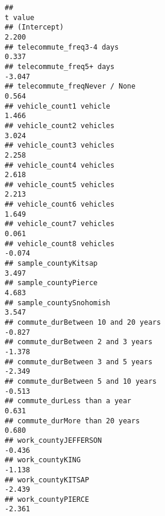 \documentclass[
]{article}
\begin{document}
\begin{verbatim}
##                                                                                             t value
## (Intercept)                                                                                   2.200
## telecommute_freq3-4 days                                                                      0.337
## telecommute_freq5+ days                                                                      -3.047
## telecommute_freqNever / None                                                                  0.564
## vehicle_count1 vehicle                                                                        1.466
## vehicle_count2 vehicles                                                                       3.024
## vehicle_count3 vehicles                                                                       2.258
## vehicle_count4 vehicles                                                                       2.618
## vehicle_count5 vehicles                                                                       2.213
## vehicle_count6 vehicles                                                                       1.649
## vehicle_count7 vehicles                                                                       0.061
## vehicle_count8 vehicles                                                                      -0.074
## sample_countyKitsap                                                                           3.497
## sample_countyPierce                                                                           4.683
## sample_countySnohomish                                                                        3.547
## commute_durBetween 10 and 20 years                                                           -0.827
## commute_durBetween 2 and 3 years                                                             -1.378
## commute_durBetween 3 and 5 years                                                             -2.349
## commute_durBetween 5 and 10 years                                                            -0.513
## commute_durLess than a year                                                                   0.631
## commute_durMore than 20 years                                                                 0.680
## work_countyJEFFERSON                                                                         -0.436
## work_countyKING                                                                              -1.138
## work_countyKITSAP                                                                            -2.439
## work_countyPIERCE                                                                            -2.361

\end{verbatim}
\end{document}
